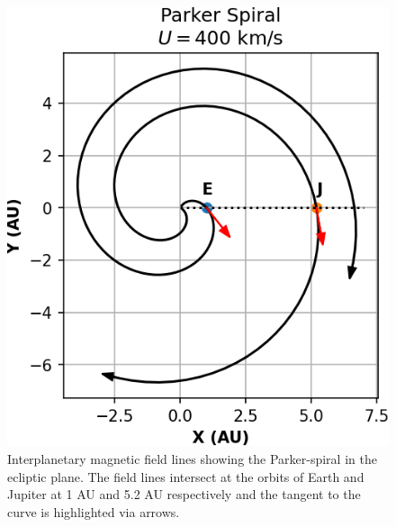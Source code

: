\begin{figure}
    \centering
    \includegraphics{images1/parker-spiral.png}
    \caption{Interplanetary magnetic field lines showing the Parker-spiral in the ecliptic plane. The field lines intersect at the orbits of Earth and Jupiter at 1 AU and 5.2 AU respectively and the tangent to the curve is highlighted via arrows.}
    \label{fig:parker-spiral}
\end{figure}

